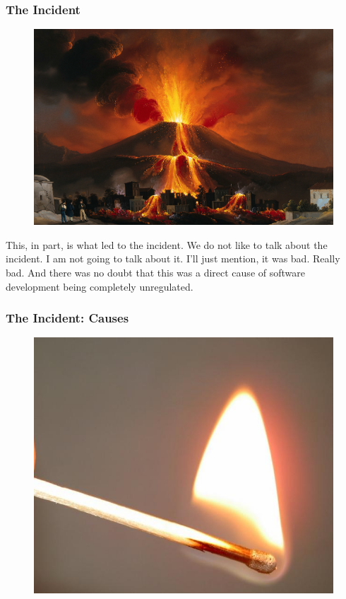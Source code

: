 \begin{frame}[fragile]
\frametitle{The Incident}

\begin{figure}
\includegraphics[scale=0.1]{volcano}
\end{figure}

\end{frame}

This,
in part,
is what led to the incident.
We do not like to talk about the incident.
I am not going to talk about it.
I'll just mention,
it was bad.
Really bad.
And there was no doubt that this was a direct cause
of software development being completely unregulated.

\begin{frame}[fragile]
\frametitle{The Incident: Causes}

\begin{figure}
\includegraphics[scale=0.5]{match}
\end{figure}

\end{frame}


